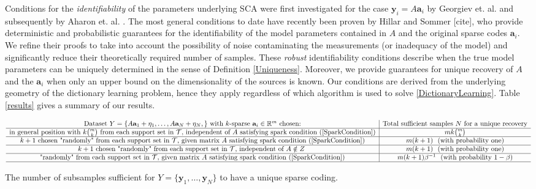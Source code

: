 \documentclass[journal, onecolumn]{IEEEtran}
\begin{document}
Conditions for the \emph{identifiability} of the parameters underlying SCA were first investigated for the case $\mathbf{y}_i = A\mathbf{a}_i$ by Georgiev et. al. \cite{Georgiev05} and subsequently by Aharon et. al. \cite{Aharon06}. The most general conditions to date have recently been proven by Hillar and Sommer [cite], who provide deterministic and probabilistic guarantees for the identifiability of the model parameters contained in $A$ and the original sparse codes $\mathbf{a}_i$. We refine their proofs to take into account the possibility of noise contaminating the measurements (or inadequacy of the model) and significantly reduce their theoretically required number of samples. These \emph{robust} identifiability conditions describe when the true model parameters can be uniquely determined in the sense of Definition \ref{Uniqueness}. Moreover, we provide guarantees for unique recovery of $A$ and the $\mathbf{a}_i$ when only an upper bound on the dimensionality of the sources is known. Our conditions are derived from the underlying geometry of the dictionary learning problem, hence they apply regardless of which algorithm is used to solve \eqref{DictionaryLearning}. Table \ref{results} gives a summary of our results.

\begin{table}\label{results}
\begin{center}
$\begin{array}{c|cc} \text{Dataset } Y = \{A\mathbf{a}_1 + \mathbf{\eta}_1, \ldots,A\mathbf{a}_N + \mathbf{\eta}_N,\} \text{ with $k$-sparse } \mathbf{a}_i \in \mathbb R^m \text{ chosen:}   & \text{Total sufficient samples } N \text{ for a unique recovery}  \\\hline 
\text{in general position with $k{m \choose k}$ from each support set in $\mathcal{T}$, independent of $A$ satisfying spark condition (\ref{SparkCondition})}  & mk{m \choose k} \\\hline     
 \text{$k+1$ chosen "randomly" from each support set in $\mathcal{T}$, given matrix $A$ satisfying spark condition (\ref{SparkCondition})}  & m(k+1) \ \ \text{(with probability one)} \\\hline 
\text{$k+1$ chosen "randomly" from each support set in $\mathcal{T}$, independent of $A \notin Z$ 
}  & m(k+1) \ \ \text{(with probability one)} \\\hline 
\text{"randomly" from each support set in $\mathcal{T}$, given matrix $A$ satisfying spark condition (\ref{SparkCondition})}  & m(k+1)\beta^{-1}\ \ \text{(with probability $1-\beta$)} \\\hline 
\end{array}$
\end{center}
\caption{The number of subsamples sufficient for $Y = \{\mathbf{y}_1, \ldots,\mathbf{y}_N\}$ to have a unique sparse coding.}
\label{table_N}
\vspace{-.3 in}
\end{table}
\end{document}
